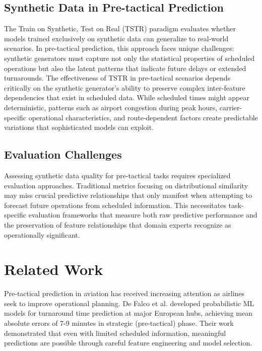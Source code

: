 \documentclass[conference]{IEEEtran}
\begin{document}
\subsection{Synthetic Data in Pre-tactical Prediction}

The Train on Synthetic, Test on Real (TSTR) paradigm evaluates whether models trained exclusively on synthetic data can generalize to real-world scenarios. In pre-tactical prediction, this approach faces unique challenges: synthetic generators must capture not only the statistical properties of scheduled operations but also the latent patterns that indicate future delays or extended turnarounds.
The effectiveness of TSTR in pre-tactical scenarios depends critically on the synthetic generator's ability to preserve complex inter-feature dependencies that exist in scheduled data. While scheduled times might appear deterministic, patterns such as airport congestion during peak hours, carrier-specific operational characteristics, and route-dependent factors create predictable variations that sophisticated models can exploit.

\subsection{Evaluation Challenges}
Assessing synthetic data quality for pre-tactical tasks requires specialized evaluation approaches. Traditional metrics focusing on distributional similarity may miss crucial predictive relationships that only manifest when attempting to forecast future operations from scheduled information. This necessitates task-specific evaluation frameworks that measure both raw predictive performance and the preservation of feature relationships that domain experts recognize as operationally significant.


\section{Related Work}

Pre-tactical prediction in aviation has received increasing attention as airlines seek to improve operational planning. De Falco et al.  \cite{de2023probabilistic} developed probabilistic ML models for turnaround time prediction at major European hubs, achieving mean absolute errors of 7-9 minutes in strategic (pre-tactical) phase. Their work demonstrated that even with limited scheduled information, meaningful predictions are possible through careful feature engineering and model selection.
\end{document}
